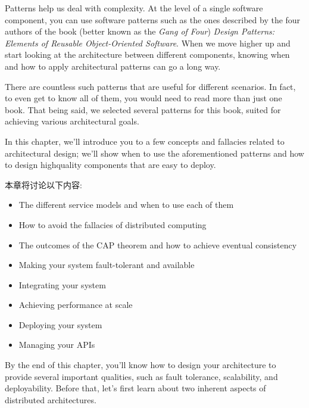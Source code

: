 
Patterns help us deal with complexity. At the level of a single software component, you can use software patterns such as the ones described by the four authors of the book (better known as the \textit{Gang of Four}) \textit{Design Patterns: Elements of Reusable Object-Oriented Software}. When we move higher up and start looking at the architecture between different components, knowing when and how to apply architectural patterns can go a long way.

There are countless such patterns that are useful for different scenarios. In fact, to even get to know all of them, you would need to read more than just one book. That being said, we selected several patterns for this book, suited for achieving various architectural goals.

In this chapter, we'll introduce you to a few concepts and fallacies related to architectural design; we'll show when to use the aforementioned patterns and how to design highquality components that are easy to deploy.

本章将讨论以下内容:

\begin{itemize}
\item The different service models and when to use each of them
\item How to avoid the fallacies of distributed computing
\item The outcomes of the CAP theorem and how to achieve eventual consistency
\item Making your system fault-tolerant and available
\item Integrating your system
\item Achieving performance at scale
\item Deploying your system
\item Managing your APIs
\end{itemize}

By the end of this chapter, you'll know how to design your architecture to provide several important qualities, such as fault tolerance, scalability, and deployability. Before that, let's first learn about two inherent aspects of distributed architectures.



























